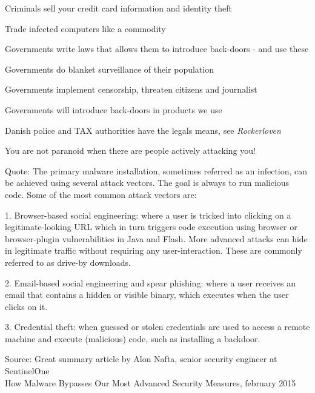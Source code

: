 \documentclass[20pt,landscape,a4paper,footrule]{foils}
\begin{document}

\begin{list2}
\item Criminals sell your credit card information and identity theft
\item Trade infected computers like a commodity
\item Governments write laws that allows them to introduce back-doors - and use these
\item Governments do blanket surveillance of their population
\item Governments implement censorship, threaten citizens and journalist
\item Governments will introduce back-doors in products we use
\item Danish police and TAX authorities have the legals means, see \emph{Rockerloven}
\end{list2}

\vskip 1cm
\centerline{You are not paranoid when there are people actively attacking you!}



Quote:
The primary malware installation, sometimes referred as an infection, can be achieved using several attack vectors.
The goal is always to run malicious code. Some of the most common attack vectors are:

\begin{list2}
\item 1. Browser-based social engineering: where a user is tricked into clicking on a legitimate-looking URL which in turn triggers code execution using browser or browser-plugin vulnerabilities in Java and Flash. More advanced attacks can hide in legitimate traffic without requiring any user-interaction. These are commonly referred to as drive-by downloads.
\item 2. Email-based social engineering and spear phishing: where a user receives an email that contains a hidden or visible binary, which executes when the user clicks on it.
\item 3. Credential theft: when guessed or stolen credentials are used to access a remote machine and execute (malicious) code, such as installing a backdoor.
\end{list2}

{\small Source: Great summary article by Alon Nafta, senior security engineer at SentinelOne\\
How Malware Bypasses Our Most Advanced Security Measures, february 2015}\\
{\tiny{}}
\end{document}
